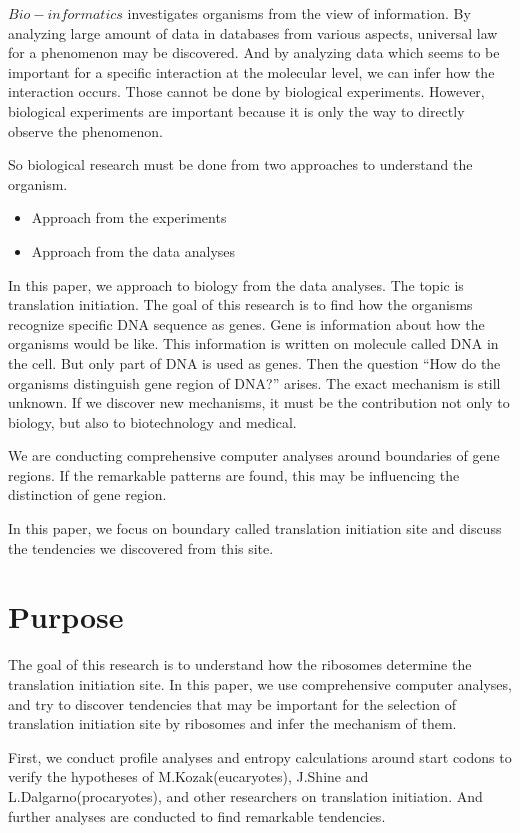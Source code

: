 $Bio-informatics$ investigates organisms from the view of information. 
By analyzing large amount of data in databases from various aspects, 
universal law for a phenomenon may be discovered. And by analyzing 
data which seems to be important for a specific interaction at the molecular
level, we can infer how the interaction occurs. Those
cannot be done by biological experiments. However, biological experiments are
important because it is only the way to directly observe the phenomenon.

So biological research must be done from two approaches to understand
 the organism.

\begin{itemize}
\item Approach from the experiments
\item Approach from the data analyses
\end{itemize}

In this paper, we approach to biology from the data analyses. The
topic is translation initiation.
The goal of this research is to find how the organisms recognize specific
DNA sequence as genes. Gene is information about how the organisms would
be like. This information is written on molecule called DNA in the cell.
But only part of DNA is used as genes. Then the question ``How do the 
organisms distinguish gene region of DNA?'' arises. The exact mechanism
is still unknown. If we discover new mechanisms, it must be the contribution
not only to biology, but also to biotechnology and medical.

We are conducting comprehensive computer analyses around boundaries
of gene regions. If the remarkable patterns are found, this may be 
influencing the distinction of gene region. 

In this paper, we focus on boundary called translation initiation site
and discuss the tendencies we discovered from this site.


\section{Purpose}

The goal of this research is to understand how the ribosomes 
determine the translation initiation site. In this paper, we use
comprehensive computer analyses, and try to discover tendencies that
 may be important for the selection of translation initiation site by 
ribosomes and infer the mechanism of them.

First, we conduct profile analyses and entropy calculations around
start codons to verify the hypotheses of
M.Kozak(eucaryotes)\cite{label3}, J.Shine and 
L.Dalgarno(procaryotes)\cite{label7}, and other researchers on translation
initiation. And further analyses are conducted to find remarkable tendencies.

